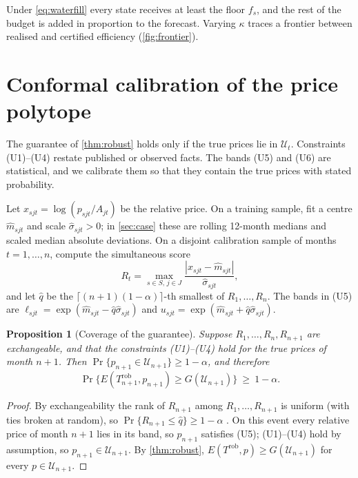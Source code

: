 \documentclass[preprint,12pt,number]{elsarticle}%
\newtheorem{proposition}{Proposition}
\theoremstyle{definition}
\theoremstyle{remark}
\newcommand{\U}{\mathcal{U}}
\begin{document}
Under \eqref{eq:waterfill} every state receives at least the floor $f_s$, and the rest of the budget is added in proportion to the forecast. Varying $\kappa$ traces a frontier between realised and certified efficiency (\cref{fig:frontier}).

\section{Conformal calibration of the price polytope}\label{sec:conformal}

The guarantee of \cref{thm:robust} holds only if the true prices lie in $\U_t$. Constraints (U1)--(U4) restate published or observed facts. The bands (U5) and (U6) are statistical, and we calibrate them so that they contain the true prices with stated probability.

Let $x_{sjt}=\log(p_{sjt}/A_{jt})$ be the relative price. On a training sample, fit a centre $\hat m_{sjt}$ and scale $\hat\sigma_{sjt}>0$; in \cref{sec:case} these are rolling 12-month medians and scaled median absolute deviations. On a disjoint calibration sample of months $t=1,\dots,n$, compute the simultaneous score
\begin{equation}\label{eq:score}
R_t=\max_{s\in S,\,j\in J}\frac{|x_{sjt}-\hat m_{sjt}|}{\hat\sigma_{sjt}},
\end{equation}
and let $\hat q$ be the $\lceil(n+1)(1-\alpha)\rceil$-th smallest of $R_1,\dots,R_n$. The bands in (U5) are $\ell_{sjt}=\exp(\hat m_{sjt}-\hat q\hat\sigma_{sjt})$ and $u_{sjt}=\exp(\hat m_{sjt}+\hat q\hat\sigma_{sjt})$.

\begin{proposition}[Coverage of the guarantee]\label{prop:conformal}
Suppose $R_1,\dots,R_n,R_{n+1}$ are exchangeable, and that the constraints (U1)--(U4) hold for the true prices of month $n+1$. Then $\Pr\{p_{n+1}\in\U_{n+1}\}\ge1-\alpha$, and therefore
\[
\Pr\big\{E(T^{\mathrm{rob}}_{n+1},p_{n+1})\ge G(\U_{n+1})\big\}\ \ge\ 1-\alpha .
\]
\end{proposition}

\begin{proof}
By exchangeability the rank of $R_{n+1}$ among $R_1,\dots,R_{n+1}$ is uniform (with ties broken at random), so $\Pr\{R_{n+1}\le\hat q\}\ge1-\alpha$ \citep{vovk2005algorithmic}. On this event every relative price of month $n+1$ lies in its band, so $p_{n+1}$ satisfies (U5); (U1)--(U4) hold by assumption, so $p_{n+1}\in\U_{n+1}$. By \cref{thm:robust}, $E(T^{\mathrm{rob}},p)\ge G(\U_{n+1})$ for every $p\in\U_{n+1}$.
\end{proof}
\end{document}
